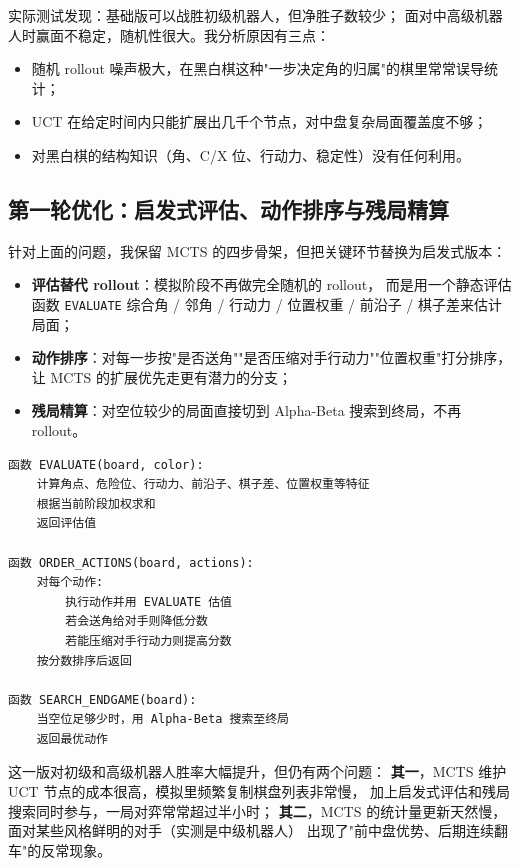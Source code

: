\documentclass[UTF8,a4paper,11pt]{ctexart}
\begin{document}
实际测试发现：基础版可以战胜初级机器人，但净胜子数较少；
面对中高级机器人时赢面不稳定，随机性很大。我分析原因有三点：
\begin{itemize}[leftmargin=1.5em,itemsep=1pt]
    \item 随机 rollout 噪声极大，在黑白棋这种"一步决定角的归属"的棋里常常误导统计；
    \item UCT 在给定时间内只能扩展出几千个节点，对中盘复杂局面覆盖度不够；
    \item 对黑白棋的结构知识（角、C/X 位、行动力、稳定性）没有任何利用。
\end{itemize}

\subsection{第一轮优化：启发式评估、动作排序与残局精算}

针对上面的问题，我保留 MCTS 的四步骨架，但把关键环节替换为启发式版本：
\begin{itemize}[leftmargin=1.5em,itemsep=1pt]
    \item \textbf{评估替代 rollout}：模拟阶段不再做完全随机的 rollout，
          而是用一个静态评估函数 \texttt{EVALUATE} 综合角 / 邻角 / 行动力 /
          位置权重 / 前沿子 / 棋子差来估计局面；
    \item \textbf{动作排序}：对每一步按"是否送角""是否压缩对手行动力""位置权重"打分排序，
          让 MCTS 的扩展优先走更有潜力的分支；
    \item \textbf{残局精算}：对空位较少的局面直接切到 Alpha-Beta 搜索到终局，不再 rollout。
\end{itemize}

\begin{lstlisting}[style=pseudostyle,caption={第一轮优化伪代码}]
函数 EVALUATE(board, color):
    计算角点、危险位、行动力、前沿子、棋子差、位置权重等特征
    根据当前阶段加权求和
    返回评估值

函数 ORDER_ACTIONS(board, actions):
    对每个动作:
        执行动作并用 EVALUATE 估值
        若会送角给对手则降低分数
        若能压缩对手行动力则提高分数
    按分数排序后返回

函数 SEARCH_ENDGAME(board):
    当空位足够少时，用 Alpha-Beta 搜索至终局
    返回最优动作
\end{lstlisting}

这一版对初级和高级机器人胜率大幅提升，但仍有两个问题：
\textbf{其一}，MCTS 维护 UCT 节点的成本很高，模拟里频繁复制棋盘列表非常慢，
加上启发式评估和残局搜索同时参与，一局对弈常常超过半小时；
\textbf{其二}，MCTS 的统计量更新天然慢，面对某些风格鲜明的对手（实测是中级机器人）
出现了"前中盘优势、后期连续翻车"的反常现象。
\end{document}
